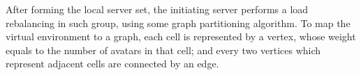 After forming the local server set, the initiating server performs a load rebalancing in such group, using some graph partitioning algorithm. To map the virtual environment to a graph, each cell is represented by a vertex, whose weight equals to the number of avatars in that cell; and every two vertices which represent adjacent cells are connected by an edge. %

%
%
%
%
